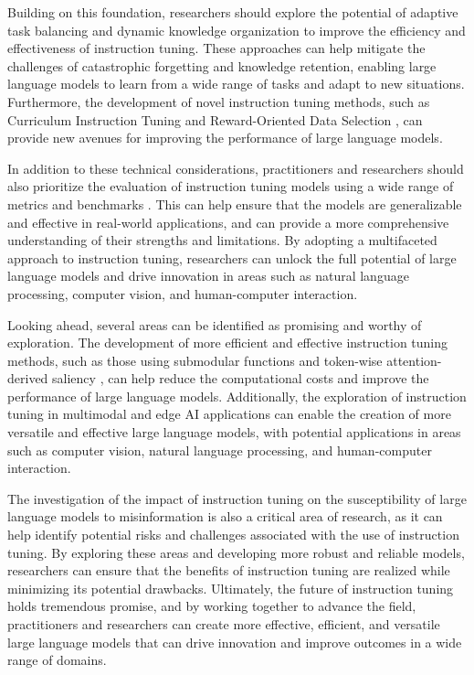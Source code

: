\documentclass[11pt]{article}
\begin{document}
Building on this foundation, researchers should explore the potential of adaptive task balancing \cite{ref14} and dynamic knowledge organization \cite{ref36} to improve the efficiency and effectiveness of instruction tuning. These approaches can help mitigate the challenges of catastrophic forgetting and knowledge retention, enabling large language models to learn from a wide range of tasks and adapt to new situations. Furthermore, the development of novel instruction tuning methods, such as Curriculum Instruction Tuning \cite{ref137} and Reward-Oriented Data Selection \cite{ref160}, can provide new avenues for improving the performance of large language models.

In addition to these technical considerations, practitioners and researchers should also prioritize the evaluation of instruction tuning models using a wide range of metrics and benchmarks \cite{ref161}. This can help ensure that the models are generalizable and effective in real-world applications, and can provide a more comprehensive understanding of their strengths and limitations. By adopting a multifaceted approach to instruction tuning, researchers can unlock the full potential of large language models and drive innovation in areas such as natural language processing, computer vision, and human-computer interaction.

Looking ahead, several areas can be identified as promising and worthy of exploration. The development of more efficient and effective instruction tuning methods, such as those using submodular functions \cite{ref35} and token-wise attention-derived saliency \cite{ref37}, can help reduce the computational costs and improve the performance of large language models. Additionally, the exploration of instruction tuning in multimodal and edge AI applications \cite{ref133} can enable the creation of more versatile and effective large language models, with potential applications in areas such as computer vision, natural language processing, and human-computer interaction.

The investigation of the impact of instruction tuning on the susceptibility of large language models to misinformation \cite{ref96} is also a critical area of research, as it can help identify potential risks and challenges associated with the use of instruction tuning. By exploring these areas and developing more robust and reliable models, researchers can ensure that the benefits of instruction tuning are realized while minimizing its potential drawbacks. Ultimately, the future of instruction tuning holds tremendous promise, and by working together to advance the field, practitioners and researchers can create more effective, efficient, and versatile large language models that can drive innovation and improve outcomes in a wide range of domains.
\end{document}

